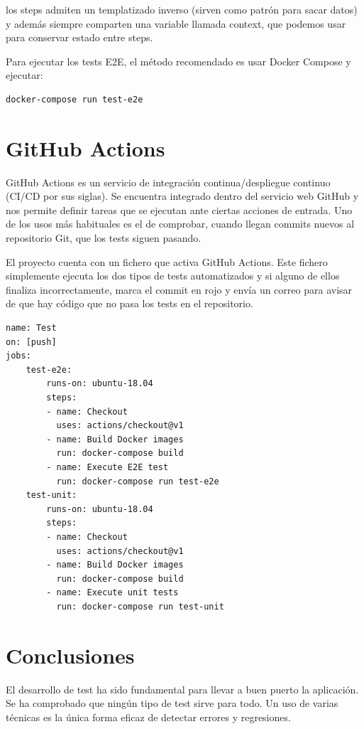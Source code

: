\documentclass[openright,twoside,12pt]{book}
\begin{document}
los steps admiten un templatizado inverso (sirven como patrón para sacar datos) y además siempre comparten una variable llamada context, que podemos usar para conservar estado entre steps.

Para ejecutar los tests E2E, el método recomendado es usar Docker Compose y ejecutar:

\begin{verbatim}
docker-compose run test-e2e
\end{verbatim}

\section{GitHub Actions}

GitHub Actions es un servicio de integración continua/despliegue continuo (CI/CD por sus siglas). Se encuentra integrado dentro del servicio web GitHub y nos permite definir tareas que se ejecutan ante ciertas acciones de entrada. Uno de los usos más habituales es el de comprobar, cuando llegan commits nuevos al repositorio Git, que los tests siguen pasando.

El proyecto cuenta con un fichero que activa GitHub Actions. Este fichero simplemente ejecuta los dos tipos de tests automatizados y si alguno de ellos finaliza incorrectamente, marca el commit en rojo y envía un correo para avisar de que hay código que no pasa los tests en el repositorio.

\noindent\begin{minipage}{\textwidth}
\begin{lstlisting}
name: Test
on: [push]
jobs:
    test-e2e:
        runs-on: ubuntu-18.04
        steps:
        - name: Checkout
          uses: actions/checkout@v1
        - name: Build Docker images
          run: docker-compose build
        - name: Execute E2E test
          run: docker-compose run test-e2e
    test-unit:
        runs-on: ubuntu-18.04
        steps:
        - name: Checkout
          uses: actions/checkout@v1
        - name: Build Docker images
          run: docker-compose build
        - name: Execute unit tests
          run: docker-compose run test-unit
\end{lstlisting}
\end{minipage}

\section{Conclusiones}

El desarrollo de test ha sido fundamental para llevar a buen puerto la aplicación. Se ha comprobado que ningún tipo de test sirve para todo. Un uso de varias técnicas es la única forma eficaz de detectar errores y regresiones.
\end{document}
